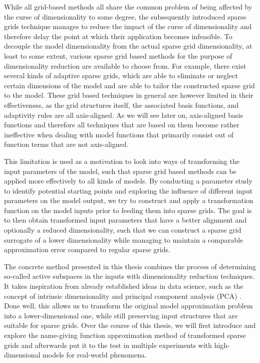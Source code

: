 \documentclass[
  a4paper,  %
  twoside,  %
  bibliography=totoc,
  headsepline,
  cleardoublepage=empty,
  parskip=half,
  draft=false
]{scrbook}
\begin{document}
While all grid-based methods all share the common problem of being affected by the curse of dimensionality to some degree, the subsequently introduced sparse grids technique \cite{Zenger1991} manages to reduce the impact of the curse of dimensionality and therefore delay the point at which their application becomes infeasible.
To decouple the model dimensionality from the actual sparse grid dimensionality, at least to some extent, various sparse grid based methods for the purpose of dimensionality reduction are available to choose from.
For example, there exist several kinds of adaptive sparse grids, which are able to eliminate or neglect certain dimensions of the model and are able to tailor the constructed sparse grid to the model.
These grid based techniques in general are however limited in their effectiveness, as the grid structures itself, the associated basis functions, and adaptivity rules are all axis-aligned.
As we will see later on, axis-aligned basis functions and therefore all techniques that are based on them become rather ineffective when dealing with model functions that primarily consist out of function terms that are not axis-aligned.

This limitation is used as a motivation to look into ways of transforming the input parameters of the model, such that sparse grid based methods can be applied more effectively to all kinds of models.
By conducting a parameter study to identify potential starting points and exploring the influence of different input parameters on the model output, we try to construct and apply a transformation function on the model inputs prior to feeding them into sparse grids.
The goal is to then obtain transformed input parameters that have a better alignment and optionally a reduced dimensionality, such that we can construct a sparse grid surrogate of a lower dimensionality while managing to maintain a comparable approximation error compared to regular sparse grids.

The concrete method presented in this thesis combines the process of determining so-called active subspaces in the inputs \cite{Constantine2015} with dimensionality reduction techniques.
It takes inspiration from already established ideas in data science, such as the concept of intrinsic dimensionality \cite{Bennett1969} and principal component analysis (PCA) \cite{Abdi2010}.
Done well, this allows us to transform the original model approximation problem into a lower-dimensional one, while still preserving input structures that are suitable for sparse grids.
Over the course of this thesis, we will first introduce and explore the name-giving function approximation method of transformed sparse grids and afterwards put it to the test in multiple experiments with high-dimensional models for real-world phenomena. 
\end{document}
